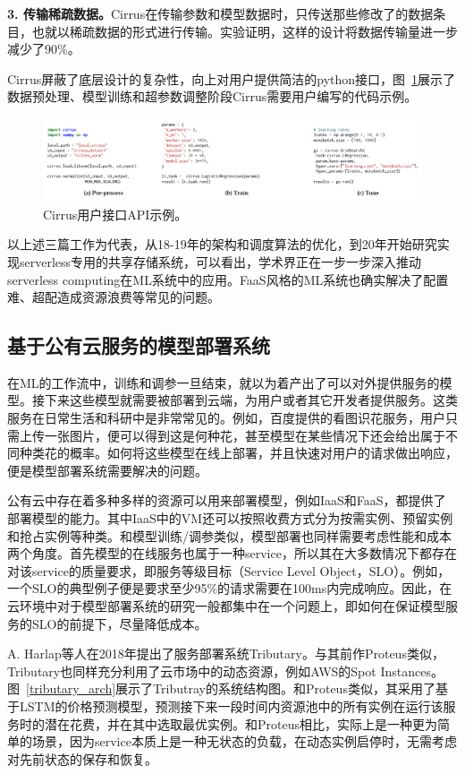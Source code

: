 \textbf{3. 传输稀疏数据。}Cirrus在传输参数和模型数据时，只传送那些修改了的数据条目，也就以稀疏数据的形式进行传输。实验证明，这样的设计将数据传输量进一步减少了90\%。

Cirrus屏蔽了底层设计的复杂性，向上对用户提供简洁的python接口，图~\ref{cirrus_api_example}展示了数据预处理、模型训练和超参数调整阶段Cirrus需要用户编写的代码示例。

\begin{figure}[h]
    \centerline{\includegraphics[width=\textwidth]{figures/cirrus-api-example.png}}
    \caption{Cirrus用户接口API示例。}
    \label{cirrus_api_example}
\end{figure}

以上述三篇工作为代表，从18-19年的架构和调度算法的优化，到20年开始研究实现serverless专用的共享存储系统，可以看出，学术界正在一步一步深入推动serverless computing在ML系统中的应用。FaaS风格的ML系统也确实解决了配置难、超配造成资源浪费等常见的问题。

\subsection{基于公有云服务的模型部署系统}
在ML的工作流中，训练和调参一旦结束，就以为着产出了可以对外提供服务的模型。接下来这些模型就需要被部署到云端，为用户或者其它开发者提供服务。这类服务在日常生活和科研中是非常常见的。例如，百度提供的看图识花服务，用户只需上传一张图片，便可以得到这是何种花，甚至模型在某些情况下还会给出属于不同种类花的概率。如何将这些模型在线上部署，并且快速对用户的请求做出响应，便是模型部署系统需要解决的问题。

公有云中存在着多种多样的资源可以用来部署模型，例如IaaS和FaaS，都提供了部署模型的能力。其中IaaS中的VM还可以按照收费方式分为按需实例、预留实例和抢占实例等种类。和模型训练/调参类似，模型部署也同样需要考虑性能和成本两个角度。首先模型的在线服务也属于一种service，所以其在大多数情况下都存在对该service的质量要求，即服务等级目标（Service Level Object，SLO）。例如，一个SLO的典型例子便是要求至少95\%的请求需要在100ms内完成响应。因此，在云环境中对于模型部署系统的研究一般都集中在一个问题上，即如何在保证模型服务的SLO的前提下，尽量降低成本。

A. Harlap等人在2018年提出了服务部署系统Tributary\parencite{harlap2018tributary}。与其前作Proteus类似，Tributary也同样充分利用了云市场中的动态资源，例如AWS的Spot Instances。图~\ref{tributary_arch}展示了Tributray的系统结构图。和Proteus类似，其采用了基于LSTM的价格预测模型，预测接下来一段时间内资源池中的所有实例在运行该服务时的潜在花费，并在其中选取最优实例。和Proteus相比，实际上是一种更为简单的场景，因为service本质上是一种无状态的负载，在动态实例启停时，无需考虑对先前状态的保存和恢复。

